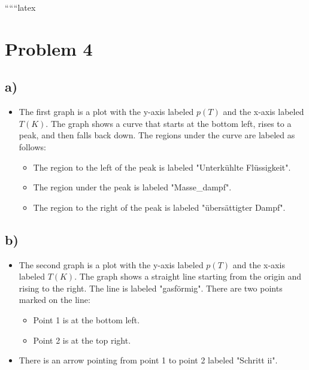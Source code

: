 
``````latex


\section*{Problem 4}

\subsection*{a)}

\begin{itemize}
    \item The first graph is a plot with the y-axis labeled \( p(T) \) and the x-axis labeled \( T(K) \). The graph shows a curve that starts at the bottom left, rises to a peak, and then falls back down. The regions under the curve are labeled as follows:
        \begin{itemize}
            \item The region to the left of the peak is labeled "Unterkühlte Flüssigkeit".
            \item The region under the peak is labeled "Masse\_dampf".
            \item The region to the right of the peak is labeled "übersättigter Dampf".
        \end{itemize}
\end{itemize}

\subsection*{b)}

\begin{itemize}
    \item The second graph is a plot with the y-axis labeled \( p(T) \) and the x-axis labeled \( T(K) \). The graph shows a straight line starting from the origin and rising to the right. The line is labeled "gasförmig". There are two points marked on the line:
        \begin{itemize}
            \item Point 1 is at the bottom left.
            \item Point 2 is at the top right.
        \end{itemize}
    \item There is an arrow pointing from point 1 to point 2 labeled "Schritt ii".
\end{itemize}


